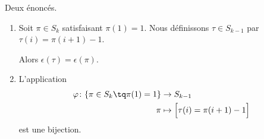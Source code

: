 \begin{lemma}		\label{LEMooEOTGooPslULz}
	Deux énoncés.
	\begin{enumerate}
		\item		\label{ITEMooQZDRooUYjcgX}
		      Soit \( \pi\in S_k\) satisfaisant \( \pi(1)=1\). Nous définissons \( \tau\in S_{k-1}\) par \( \tau(i)=\pi(i+1)-1 \).

		      Alors \( \epsilon(\tau)=\epsilon(\pi)\).
		\item		\label{ITEMooBUGZooVCVhKz}
		      L'application
		      \begin{equation}
			      \begin{aligned}
				      \varphi\colon \{ \pi\in S_k\tq \pi(1)=1 \} & \to S_{k-1}                             \\
				      \pi                                        & \mapsto \Big[  \tau(i)=\pi(i+1)-1 \Big]
			      \end{aligned}
		      \end{equation}
		      est une bijection.
	\end{enumerate}
\end{lemma}

